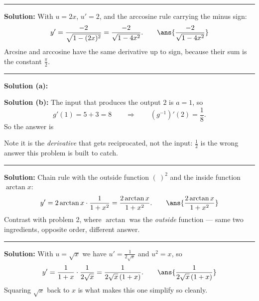 \documentclass[12pt]{article}
\begin{document}
\vspace{0.15cm}\noindent\rule{\linewidth}{0.2pt}\vspace{0.15cm}


\textbf{Solution:} With $u = 2x$, $u' = 2$, and the arccosine rule carrying the
minus sign:
\[
  y' = \frac{-2}{\sqrt{1-(2x)^2}} = \frac{-2}{\sqrt{1-4x^2}}.
  \qquad \ans{\dfrac{-2}{\sqrt{1-4x^2}}}
\]
Arcsine and arccosine have the same derivative up to sign, because their sum is
the constant $\frac{\pi}{2}$.

\vspace{0.15cm}\noindent\rule{\linewidth}{0.2pt}\vspace{0.15cm}


\textbf{Solution (a):} 

\textbf{Solution (b):} The input that produces the output $2$ is $a = 1$, so
\[
  g'(1) = 5 + 3 = 8 \qquad\Longrightarrow\qquad
  \left(g^{-1}\right)'(2) = \frac{1}{8}.
\]
So the answer is 

Note it is the \emph{derivative} that gets reciprocated, not the input:
$\frac{1}{2}$ is the wrong answer this problem is built to catch.

\vspace{0.15cm}\noindent\rule{\linewidth}{0.2pt}\vspace{0.15cm}


\textbf{Solution:} Chain rule with the outside function $(\ )^2$ and the inside
function $\arctan x$:
\[
  y' = 2\arctan x \cdot \frac{1}{1+x^2} = \frac{2\arctan x}{1+x^2}.
  \qquad \ans{\dfrac{2\arctan x}{1+x^2}}
\]
Contrast with problem 2, where $\arctan$ was the \emph{outside} function ---
same two ingredients, opposite order, different answer.

\vspace{0.15cm}\noindent\rule{\linewidth}{0.2pt}\vspace{0.15cm}


\textbf{Solution:} With $u = \sqrt{x}$ we have $u' = \frac{1}{2\sqrt{x}}$ and
$u^2 = x$, so
\[
  y' = \frac{1}{1 + x} \cdot \frac{1}{2\sqrt{x}}
     = \frac{1}{2\sqrt{x}\,(1+x)}.
  \qquad \ans{\dfrac{1}{2\sqrt{x}\,(1+x)}}
\]
Squaring $\sqrt{x}$ back to $x$ is what makes this one simplify so cleanly.
\end{document}
